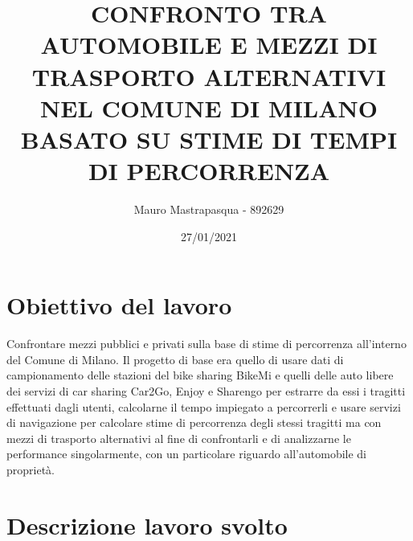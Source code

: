 \documentclass[a4paper,11pt]{article}
\title{{\Large\textbf{CONFRONTO TRA AUTOMOBILE E \linebreak MEZZI DI TRASPORTO ALTERNATIVI \linebreak NEL COMUNE DI MILANO BASATO SU \linebreak STIME DI TEMPI DI PERCORRENZA}}}
\author{\LARGE{Mauro Mastrapasqua - 892629}}
\date{\Large{27/01/2021}}
\begin{document}
	\maketitle
	\vspace{1cm}
	
\section{Obiettivo del lavoro}

\large{
Confrontare mezzi pubblici e privati sulla base di stime di percorrenza all'interno del Comune di Milano. Il progetto di base era quello di usare dati di campionamento delle stazioni del bike sharing BikeMi e quelli delle auto libere dei servizi di car sharing Car2Go, Enjoy e Sharengo per estrarre da essi i tragitti effettuati dagli utenti, calcolarne il tempo impiegato a percorrerli e usare servizi di navigazione per calcolare stime di percorrenza degli stessi tragitti ma con mezzi di trasporto alternativi al fine di confrontarli e di analizzarne le performance singolarmente, con un particolare riguardo all'automobile di proprietà.
}

\section{Descrizione lavoro svolto}
\end{document}
